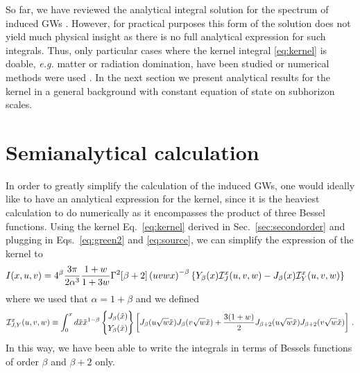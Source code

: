 \documentclass[aps,10pt,prd,groupedaddress,nofootinbib,notitlepage,eqsecnum,preprintnumbers]{revtex4-1}
\begin{document}
So far, we have reviewed the analytical integral solution for the spectrum of induced GWs \cite{Baumann:2007zm,Kohri:2018awv}. However, for practical purposes this form of the solution does not yield much physical insight as there is no full analytical expression for such integrals. Thus, only particular cases where the kernel integral \eqref{eq:kernel} is doable, \textit{e.g.} matter or radiation domination, have been studied or numerical methods were used \cite{Tomikawa:2019tvi}. In the next section we present analytical results for the kernel in a general background with constant equation of state on subhorizon scales. 



\section{Semianalytical calculation\label{sec:analyticalcalculation}}

In order to greatly simplify the calculation of the induced GWs, one would ideally like to have an analytical expression for the kernel, since it is the heaviest calculation to do numerically as it encompasses the product of three Bessel functions. Using the kernel Eq.~\eqref{eq:kernel} derived in Sec.~\ref{sec:secondorder} and plugging in Eqs.~\eqref{eq:green2} and \eqref{eq:source}, we can simplify the expression of the kernel to
\begin{align}\label{eq:kernel2}
I(x,u,v)=4^{\beta}\frac{3\pi}{2\alpha^3}\frac{1+w}{1+3w}\Gamma^2[\beta+2]&\left(uvwx\right)^{-\beta}\left\{Y_\beta(x){\cal I}^x_J(u,v,w)-J_\beta(x){\cal I}^x_Y(u,v,w)\right\}
\end{align}
where we used that $\alpha=1+\beta$ and we defined
\begin{align}
{\cal I}^x_{J,Y}
(u,v,w)\equiv\int_0^{x} d\tilde x \tilde x^{1-\beta}
\left\{	
\begin{aligned}
	J_\beta(\tilde x)\\
	Y_\beta(\tilde x)
\end{aligned}
\right\}
\left[J_{\beta}(u\sqrt{w}\tilde x)J_{\beta}(v\sqrt{w}\tilde x)+\frac{3(1+w)}{2}J_{\beta+2}(u\sqrt{w}\tilde x)J_{\beta+2}(v\sqrt{w}\tilde x)\right]\,.
\end{align}
In this way, we have been able to write the integrals in terms of Bessels functions of order $\beta$ and $\beta+2$ only.
\end{document}
